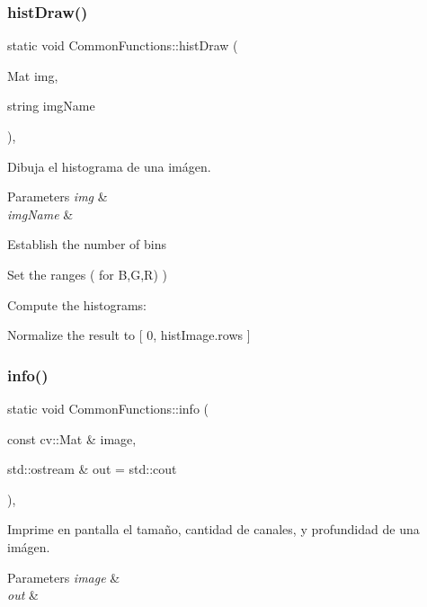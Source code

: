 \subsubsection{\texorpdfstring{hist\+Draw()}{histDraw()}}
{\footnotesize\ttfamily static void Common\+Functions\+::hist\+Draw (\begin{DoxyParamCaption}\item[{Mat}]{img,  }\item[{string}]{img\+Name }\end{DoxyParamCaption})\hspace{0.3cm}{\ttfamily [inline]}, {\ttfamily [static]}}



Dibuja el histograma de una imágen. 


\begin{DoxyParams}{Parameters}
{\em img} & \\
\hline
{\em img\+Name} & \\
\hline
\end{DoxyParams}
Establish the number of bins

Set the ranges ( for B,G,R) )

Compute the histograms\+:

Normalize the result to \mbox{[} 0, hist\+Image.\+rows \mbox{]} \mbox{\label{classCommonFunctions_a51a3e18bdcc2c918ebc81f0cc1f47851}} 
\subsubsection{\texorpdfstring{info()}{info()}}
{\footnotesize\ttfamily static void Common\+Functions\+::info (\begin{DoxyParamCaption}\item[{const cv\+::\+Mat \&}]{image,  }\item[{std\+::ostream \&}]{out = {\ttfamily std\+:\+:cout} }\end{DoxyParamCaption})\hspace{0.3cm}{\ttfamily [inline]}, {\ttfamily [static]}}



Imprime en pantalla el tamaño, cantidad de canales, y profundidad de una imágen. 


\begin{DoxyParams}{Parameters}
{\em image} & \\
\hline
{\em out} & \\
\hline
\end{DoxyParams}
\mbox{\label{classCommonFunctions_a8f31532bc3dd60e5c95d40daaef7c705}} 
